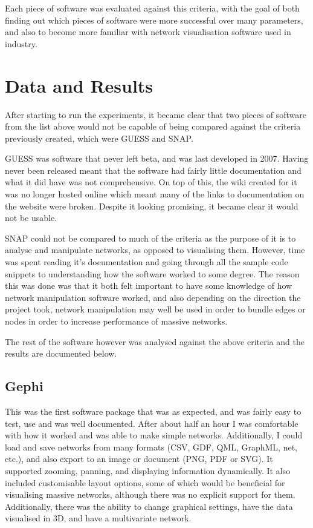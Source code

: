 \documentclass[../dissertation.tex]{subfiles}
\begin{document}
Each piece of software was evaluated against this criteria, with the goal of both finding out which pieces of software were more successful over many parameters, and also to become more familiar with network visualisation software used in industry.

\section{Data and Results}

After starting to run the experiments, it became clear that two pieces of software from the list above would not be capable of being compared against the criteria previously created, which were GUESS and SNAP.

GUESS was software that never left beta, and was last developed in 2007. Having never been released meant that the software had fairly little documentation and what it did have was not comprehensive. On top of this, the wiki created for it was no longer hosted online which meant many of the links to documentation on the website were broken. Despite it looking promising, it became clear it would not be usable.

SNAP could not be compared to much of the criteria as the purpose of it is to analyse and manipulate networks, as opposed to visualising them. However, time was spent reading it’s documentation and going through all the sample code snippets to understanding how the software worked to some degree. The reason this was done was that it both felt important to have some knowledge of how network manipulation software worked, and also depending on the direction the project took, network manipulation may well be used in order to bundle edges or nodes in order to increase performance of massive networks.

The rest of the software however was analysed against the above criteria and the results are documented below.

\subsection{Gephi}

This was the first software package that was as expected, and was fairly easy to test, use and was well documented. After about half an hour I was comfortable with how it worked and was able to make simple networks. Additionally, I could load and save networks from many formats (CSV, GDF, QML, GraphML, net, etc.), and also export to an image or document (PNG, PDF or SVG). It supported zooming, panning, and displaying information dynamically. It also included customisable layout options, some of which would be beneficial for visualising massive networks, although there was no explicit support for them. Additionally, there was the ability to change graphical settings, have the data visualised in 3D, and have a multivariate network.
\end{document}
